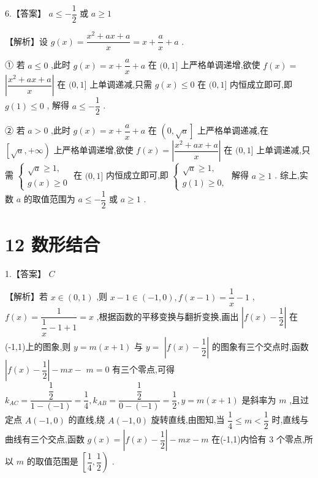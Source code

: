 \documentclass[10pt]{article}
\begin{document}
6.【答案】 $a \leq   - \dfrac{1}{2}$ 或 $a \geq  1$

【解析】设 $g\left( x\right)  = \dfrac{{x}^{2} + {ax} + a}{x} = x + \dfrac{a}{x} + a$ .

① 若 $a \leq  0$ ,此时 $g\left( x\right)  = x + \dfrac{a}{x} + a$ 在 $(0,1\rbrack$ 上严格单调递增,欲使 $f\left( x\right)  =$  $\left| \dfrac{{x}^{2} + {ax} + a}{x}\right|$ 在 $(0,1\rbrack$ 上单调递减,只需 $g\left( x\right)  \leq  0$ 在 $(0,1\rbrack$ 内恒成立即可,即 $g\left( 1\right)  \leq  0$ , 解得 $a \leq   - \dfrac{1}{2}$ .

② 若 $a > 0$ ,此时 $g\left( x\right)  = x + \dfrac{a}{x} + a$ 在 $\left( {0,\sqrt{a}}\right\rbrack$ 上严格单调递减,在 $\left\lbrack  {\sqrt{a}, + \infty }\right)$ 上严格单调递增,欲使 $f\left( x\right)  = \left| \dfrac{{x}^{2} + {ax} + a}{x}\right|$ 在 $(0,1\rbrack$ 上单调递减,只需 $\left\{  \begin{array}{l} \sqrt{a} \geq  1, \\  g\left( x\right)  \geq  0 \end{array}\right.$ 在 $(0,1\rbrack$ 内恒成立即可,即 $\left\{  \begin{array}{l} \sqrt{a} \geq  1, \\  g\left( 1\right)  \geq  0, \end{array}\right.$ 解得 $a \geq  1$ . 综上,实数 $a$ 的取值范围为 $a \leq   - \dfrac{1}{2}$ 或 $a \geq  1$ .

\section*{12 数形结合}

1.【答案】 ${C}$

【解析】若 $x \in  \left( {0,1}\right)$ ,则 $x - 1 \in  \left( {-1,0}\right) ,f\left( {x - 1}\right)  = \dfrac{1}{x} - 1$ , $f\left( x\right)  = \dfrac{1}{\dfrac{1}{x} - 1 + 1} = x$ ,根据函数的平移变换与翻折变换,画出 $\left| {f\left( x\right)  - \dfrac{1}{2}}\right|$ 在(-1,1)上的图象,则 $y = m\left( {x + 1}\right)$ 与 $y =$  $\left| {f\left( x\right)  - \dfrac{1}{2}}\right|$ 的图象有三个交点时,函数 $\left| {f\left( x\right)  - \dfrac{1}{2}}\right|  - {mx} -$  $m = 0$ 有三个零点,可得 ${k}_{AC} = \dfrac{\dfrac{1}{2}}{1 - \left( {-1}\right) } = \dfrac{1}{4},{k}_{AB} = \dfrac{\dfrac{1}{2}}{0 - \left( {-1}\right) } = \dfrac{1}{2},y = m\left( {x + 1}\right)$ 是斜率为 $m$ ,且过定点 $A\left( {-1,0}\right)$ 的直线,绕 $A\left( {-1,0}\right)$ 旋转直线,由图知,当 $\dfrac{1}{4} \leq  m < \dfrac{1}{2}$ 时,直线与曲线有三个交点,函数 $g\left( x\right)  = \left| {f\left( x\right)  - \dfrac{1}{2}}\right|  - {mx} - m$ 在(-1,1)内恰有 3 个零点,所以 $m$ 的取值范围是 $\left\lbrack  {\dfrac{1}{4},\dfrac{1}{2}}\right)$ .
\end{document}
